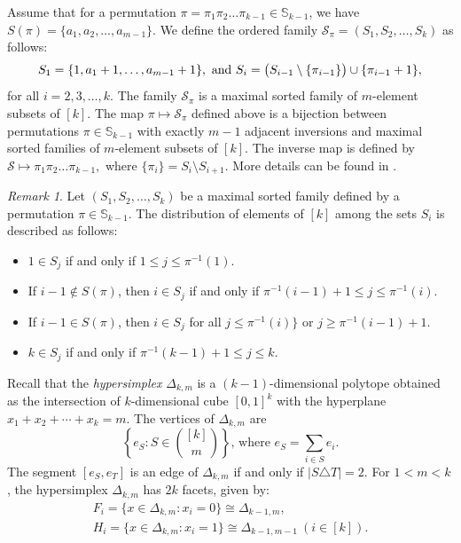 \documentclass{birkjour}
\theoremstyle{definition}
\theoremstyle{remark}
\newtheorem{rem}[thm]{Remark}
\numberwithin{equation}{section}
\begin{document}
Assume that for a permutation $\pi=\pi_1\pi_2\ldots \pi_{k-1}\in
\mathbb{S}_{k-1}$, we have $S(\pi)=\{a_1,a_2,\ldots,a_{m-1}\}$. We
define the ordered family $\mathcal S_\pi=(S_1,S_2,\ldots,S_k)$ as
follows:
\begin{equation}\label{sortirana familija}
S_1=\{1,a_1+1,\ldots,a_{m-1}+1\},\\
 \text{ and }
S_i=\big (S_{i-1}\setminus \{\pi_{i-1}\}\big)\cup\{\pi_{i-1}+1\},
\end{equation}
for all $i=2,3,\ldots,k$. \noindent The family $\mathcal S_\pi$ is
a maximal sorted family of $m$-element subsets of $[k]$. The map
$\pi\mapsto \mathcal S_\pi$ defined above is a bijection between
permutations $\pi\in \mathbb{S}_{k-1}$ with exactly $m-1$ adjacent
inversions and maximal sorted families of $m$-element subsets of
$[k]$. The inverse map is defined by $\mathcal S\mapsto
\pi_1\pi_2\ldots\pi_{k-1},$
 where $\{\pi_i\}=S_{i}\setminus
S_{i+1}$. More details can be found in \cite{Lam}.
\begin{rem}\label{R:rasporedusorted}
Let $(S_1,S_2,\ldots,S_k)$ be a maximal sorted family defined by a
permutation $\pi\in \mathbb{S}_{k-1}$. The distribution of
elements of $[k]$ among the sets $S_i$ is described as follows:
\begin{itemize}
    \item $1\in S_j$ if and only if $1\leq j\leq\pi^{-1}(1)$.
    \item If $i-1\notin S(\pi)$, then $i\in S_j$ if and
    only if $\pi^{-1}(i-1)+1\leq j\leq \pi^{-1}(i)$.
    \item If $i-1\in S(\pi)$, then $i\in S_j$ for all
     $j\leq \pi^{-1}(i)\}$ or
     $j\geq \pi^{-1}(i-1)+1$.
    \item $k\in S_j$ if and only if $\pi^{-1}(k-1)+1\leq j\leq k$.
\end{itemize}
\end{rem}


Recall that the \emph{hypersimplex} $\Delta_{k,m}$ is a
$(k-1)$-dimensional polytope obtained as the intersection of
$k$-dimensional cube $[0,1]^k$ with the hyperplane
$x_1+x_2+\cdots+x_{k}=m$. The vertices of $\Delta_{k,m}$ are
$$\left\{e_S: S\in {[k]\choose m}\right\}\textrm{, where }e_S=
\sum_{i\in S}e_i.$$ The segment $[e_S,e_T]$ is an edge of
$\Delta_{k,m}$ if and only if $|S \triangle T|=2$. For $1<m<k$,
the hypersimplex $\Delta_{k,m}$ has $2k$ facets, given by:
\begin{equation}\label{E:facets}\begin{split}
F_i=\{x\in \Delta_{k,m}:x_i=0\}\cong \Delta_{k-1,m}\textrm{,
}\\
H_i=\{x\in \Delta_{k,m}:x_i=1\}\cong \Delta_{k-1,m-1}\ (i\in[k]).
\end{split}
\end{equation}
\end{document}
